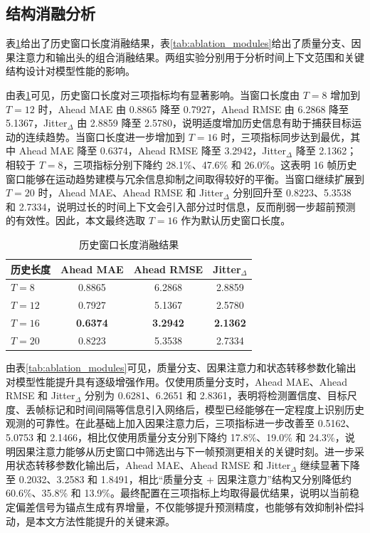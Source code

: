 \documentclass[journal]{IEEEtran}
\begin{document}
\subsection{结构消融分析}
表\ref{tab:ablation_history}给出了历史窗口长度消融结果，表\ref{tab:ablation_modules}给出了质量分支、因果注意力和输出头的组合消融结果。两组实验分别用于分析时间上下文范围和关键结构设计对模型性能的影响。

由表\ref{tab:ablation_history}可见，历史窗口长度对三项指标均有显著影响。当窗口长度由 $T=8$ 增加到 $T=12$ 时，Ahead MAE 由 0.8865 降至 0.7927，Ahead RMSE 由 6.2868 降至 5.1367，Jitter$_\Delta$ 由 2.8859 降至 2.5780，说明适度增加历史信息有助于捕获目标运动的连续趋势。当窗口长度进一步增加到 $T=16$ 时，三项指标同步达到最优，其中 Ahead MAE 降至 0.6374，Ahead RMSE 降至 3.2942，Jitter$_\Delta$ 降至 2.1362；相较于 $T=8$，三项指标分别下降约 28.1\%、47.6\% 和 26.0\%。这表明 16 帧历史窗口能够在运动趋势建模与冗余信息抑制之间取得较好的平衡。当窗口继续扩展到 $T=20$ 时，Ahead MAE、Ahead RMSE 和 Jitter$_\Delta$ 分别回升至 0.8223、5.3538 和 2.7334，说明过长的时间上下文会引入部分过时信息，反而削弱一步超前预测的有效性。因此，本文最终选取 $T=16$ 作为默认历史窗口长度。

\begin{table}[H]
\centering
\caption{历史窗口长度消融结果}
\label{tab:ablation_history}
\begingroup
\fontsize{6.2pt}{7.2pt}\selectfont
\setlength{\tabcolsep}{2.4pt}
\renewcommand{\arraystretch}{0.9}
\begin{tabular*}{0.94\columnwidth}{@{\extracolsep{\fill}}lccc}
\toprule
\textbf{历史长度} & \textbf{Ahead MAE} & \textbf{Ahead RMSE} & \textbf{Jitter$_\Delta$} \\
\midrule
$T=8$ & 0.8865 & 6.2868 & 2.8859 \\
$T=12$ & 0.7927 & 5.1367 & 2.5780 \\
$T=16$ & \textbf{0.6374} & \textbf{3.2942} & \textbf{2.1362} \\
$T=20$ & 0.8223 & 5.3538 & 2.7334 \\
\bottomrule
\end{tabular*}%
\endgroup
\end{table}

由表\ref{tab:ablation_modules}可见，质量分支、因果注意力和状态转移参数化输出对模型性能提升具有逐级增强作用。仅使用质量分支时，Ahead MAE、Ahead RMSE 和 Jitter$_\Delta$ 分别为 0.6281、6.2651 和 2.8361，表明将检测置信度、目标尺度、丢帧标记和时间间隔等信息引入网络后，模型已经能够在一定程度上识别历史观测的可靠性。在此基础上加入因果注意力后，三项指标进一步改善至 0.5162、5.0753 和 2.1466，相比仅使用质量分支分别下降约 17.8\%、19.0\% 和 24.3\%，说明因果注意力能够从历史窗口中筛选出与下一帧预测更相关的关键时刻。进一步采用状态转移参数化输出后，Ahead MAE、Ahead RMSE 和 Jitter$_\Delta$ 继续显著下降至 0.2032、3.2583 和 1.8491，相比“质量分支 + 因果注意力”结构又分别降低约 60.6\%、35.8\% 和 13.9\%。最终配置在三项指标上均取得最优结果，说明以当前稳定偏差信号为锚点生成有界增量，不仅能够提升预测精度，也能够有效抑制补偿抖动，是本文方法性能提升的关键来源。
\end{document}
